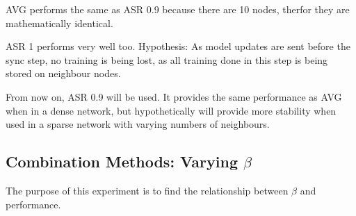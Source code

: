 AVG performs the same as ASR 0.9 because there are 10 nodes, therfor they are mathematically identical.

ASR 1 performs very well too. Hypothesis: As model updates are sent before the sync step, no training is being lost, as all training done in this step is being stored on neighbour nodes.

From now on, ASR 0.9 will be used. It provides the same performance as AVG when in a dense network, but hypothetically will provide more stability when used in a sparse network with varying numbers of neighbours.

\subsection{Combination Methods: Varying $\beta$}
The purpose of this experiment is to find the relationship between $\beta$ and performance.